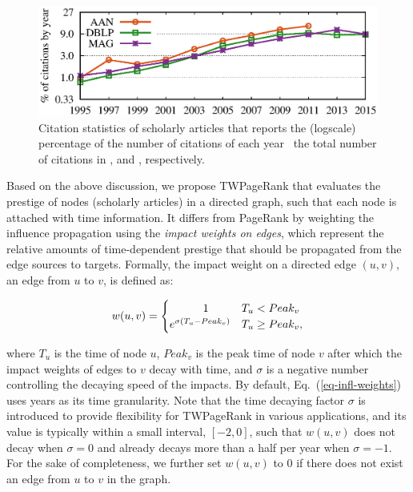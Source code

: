 \begin{figure}
\centering
\includegraphics[scale=0.48]{fig/yearly-references.eps}
\vspace{-1ex}
\caption{\small Citation statistics of scholarly articles that reports the (logscale) percentage of the number of citations of each year \wrt\ the total number of citations  in  \aan, \aminer and \magdata, respectively.}
\label{fig-reference}
\vspace{-4ex}
\end{figure}


Based on the above discussion, we propose TWPageRank that evaluates the prestige of nodes (\eg scholarly articles) in a directed graph, such that each node is attached with time information. It differs from PageRank by weighting the influence propagation using the {\em impact weights on edges}, which represent the relative amounts of time-dependent prestige that should be propagated from the edge sources to targets.
%
Formally, the impact weight on a directed edge $(u,v)$, \ie an edge from $u$ to $v$, is defined as:

\vspace{-1ex}
\begin{small}
\begin{equation} \label{eq-infl-weights}
w(u,v)  =  \begin{cases}  \hspace{7ex} 1 & T_u <  Peak_v \\
  e^{\sigma(T_u-Peak_v)} & T_u \geq Peak_v,
\end{cases}
\end{equation}
\end{small}
%
\noindent where $T_u$ is the time of node $u$, $Peak_v$ is the peak time of node $v$ after which the impact weights of edges to $v$ decay with time, and $\sigma$ is a negative number controlling the decaying speed of the impacts.
By default, Eq.~(\ref{eq-infl-weights}) uses years as its time granularity. Note that the time decaying factor $\sigma$ is introduced to provide flexibility for TWPageRank in various applications, and its value is typically within a small interval, \eg $[-2,0]$, such that $w(u,v)$ does not decay when $\sigma=0$ and already decays more than a half per year when $\sigma=-1$.
For the sake of completeness, we further set $w(u,v)$ to $0$ if there does not exist an edge from $u$ to $v$ in the graph.


